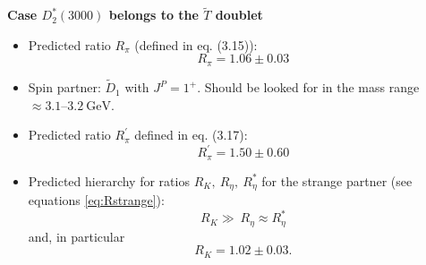 \begin{center}
{\begin{minipage}{\textwidth}
    {\large \bfseries Case $D_2^*(3000)$ belongs to the $\tilde{T}$ doublet}
    \begin{itemize}
      \item Predicted ratio $R_\pi$ (defined in eq. (3.15)):
      \begin{equation*}
        R_\pi=1.06 \pm 0.03
      \end{equation*}
      \item Spin partner: $\tilde{D}_1$ with $J^P=1^+$. Should be looked for in the mass range $\approx 3.1\text{--}3.2 \ \text{GeV}$.
      \item Predicted  ratio $R_\pi^\prime$ defined in eq. (3.17):
        \begin{equation*}
          R_\pi^\prime=1.50 \pm 0.60
        \end{equation*}
      \item Predicted hierarchy for ratios $R_K,\ R_\eta,\ R_\eta^*$ for  the strange partner (see equations \eqref{eq:Rstrange}):
      \begin{equation*}
        R_K \gg \ R_\eta \approx R_\eta^*
      \end{equation*}
      and, in particular
      \begin{equation*}
        R_K=1.02 \pm 0.03.
      \end{equation*}
    \end{itemize}
  \end{minipage}}
\end{center}
\vspace*{\fill}

